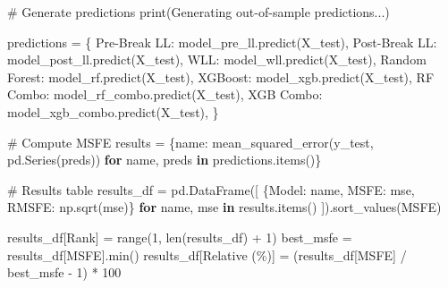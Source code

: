 \documentclass[
  letterpaper,
  DIV=11,
  numbers=noendperiod]{scrartcl}
\newenvironment{Shaded}{\begin{snugshade}}{\end{snugshade}}
\newcommand{\BuiltInTok}[1]{\textcolor[rgb]{0.00,0.23,0.31}{#1}}
\newcommand{\CommentTok}[1]{\textcolor[rgb]{0.37,0.37,0.37}{#1}}
\newcommand{\ControlFlowTok}[1]{\textcolor[rgb]{0.00,0.23,0.31}{\textbf{#1}}}
\newcommand{\DecValTok}[1]{\textcolor[rgb]{0.68,0.00,0.00}{#1}}
\newcommand{\KeywordTok}[1]{\textcolor[rgb]{0.00,0.23,0.31}{\textbf{#1}}}
\newcommand{\NormalTok}[1]{\textcolor[rgb]{0.00,0.23,0.31}{#1}}
\newcommand{\OperatorTok}[1]{\textcolor[rgb]{0.37,0.37,0.37}{#1}}
\newcommand{\StringTok}[1]{\textcolor[rgb]{0.13,0.47,0.30}{#1}}
\begin{document}
\begin{Shaded}
\begin{Highlighting}[]
\CommentTok{\# Generate predictions}
\BuiltInTok{print}\NormalTok{(}\StringTok{\textquotesingle{}Generating out{-}of{-}sample predictions...\textquotesingle{}}\NormalTok{)}

\NormalTok{predictions }\OperatorTok{=}\NormalTok{ \{}
    \StringTok{\textquotesingle{}Pre{-}Break LL\textquotesingle{}}\NormalTok{: model\_pre\_ll.predict(X\_test),}
    \StringTok{\textquotesingle{}Post{-}Break LL\textquotesingle{}}\NormalTok{: model\_post\_ll.predict(X\_test),}
    \StringTok{\textquotesingle{}WLL\textquotesingle{}}\NormalTok{: model\_wll.predict(X\_test),}
    \StringTok{\textquotesingle{}Random Forest\textquotesingle{}}\NormalTok{: model\_rf.predict(X\_test),}
    \StringTok{\textquotesingle{}XGBoost\textquotesingle{}}\NormalTok{: model\_xgb.predict(X\_test),}
    \StringTok{\textquotesingle{}RF Combo\textquotesingle{}}\NormalTok{: model\_rf\_combo.predict(X\_test),}
    \StringTok{\textquotesingle{}XGB Combo\textquotesingle{}}\NormalTok{: model\_xgb\_combo.predict(X\_test),}
\NormalTok{\}}

\CommentTok{\# Compute MSFE}
\NormalTok{results }\OperatorTok{=}\NormalTok{ \{name: mean\_squared\_error(y\_test, pd.Series(preds))}
           \ControlFlowTok{for}\NormalTok{ name, preds }\KeywordTok{in}\NormalTok{ predictions.items()\}}

\CommentTok{\# Results table}
\NormalTok{results\_df }\OperatorTok{=}\NormalTok{ pd.DataFrame([}
\NormalTok{    \{}\StringTok{\textquotesingle{}Model\textquotesingle{}}\NormalTok{: name, }\StringTok{\textquotesingle{}MSFE\textquotesingle{}}\NormalTok{: mse, }\StringTok{\textquotesingle{}RMSFE\textquotesingle{}}\NormalTok{: np.sqrt(mse)\}}
    \ControlFlowTok{for}\NormalTok{ name, mse }\KeywordTok{in}\NormalTok{ results.items()}
\NormalTok{]).sort\_values(}\StringTok{\textquotesingle{}MSFE\textquotesingle{}}\NormalTok{)}

\NormalTok{results\_df[}\StringTok{\textquotesingle{}Rank\textquotesingle{}}\NormalTok{] }\OperatorTok{=} \BuiltInTok{range}\NormalTok{(}\DecValTok{1}\NormalTok{, }\BuiltInTok{len}\NormalTok{(results\_df) }\OperatorTok{+} \DecValTok{1}\NormalTok{)}
\NormalTok{best\_msfe }\OperatorTok{=}\NormalTok{ results\_df[}\StringTok{\textquotesingle{}MSFE\textquotesingle{}}\NormalTok{].}\BuiltInTok{min}\NormalTok{()}
\NormalTok{results\_df[}\StringTok{\textquotesingle{}Relative (\%)\textquotesingle{}}\NormalTok{] }\OperatorTok{=}\NormalTok{ (results\_df[}\StringTok{\textquotesingle{}MSFE\textquotesingle{}}\NormalTok{] }\OperatorTok{/}\NormalTok{ best\_msfe }\OperatorTok{{-}} \DecValTok{1}\NormalTok{) }\OperatorTok{*} \DecValTok{100}


\end{Highlighting}
\end{Shaded}
\end{document}
